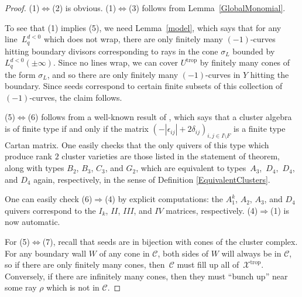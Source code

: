 \documentclass[11pt]{article}
\numberwithin{equation}{section}
\numberwithin{figure}{section}
\numberwithin{table}{section}
\DeclareMathOperator{\trop}{trop}
\let\s=\mathcal
\theoremstyle{definition}
\begin{document}
\begin{proof}(1)$\Leftrightarrow$(2) is obvious. (1)$\Leftrightarrow$(3) follows from Lemma~\ref{GlobalMonomial}.

To see that (1) implies (5), we need Lemma~\ref{model}, which says that for any line~$L_q^{d<0}$ which does not wrap, there are only finitely many $(-1)$-curves hitting boundary divisors corresponding to rays in the cone $\sigma_{L}$ bounded by $L_q^{d<0}(\pm \infty)$. Since no lines wrap, we can cover $U^{\trop}$ by finitely many cones of the form $\sigma_{L}$, and so there are only finitely many $(-1)$-curves in $Y$ hitting the boundary. Since seeds correspond to certain finite subsets of this collection of $(-1)$-curves, the claim follows.

(5)$\Leftrightarrow$(6) follows from a well-known result of \cite{FZ2}, which says that a cluster algebra is of finite type if and only if the matrix $(-|\epsilon_{ij}|+2\delta_{ij})_{i,j\in I\setminus F}$ is a finite type Cartan matrix. One easily checks that the only quivers of this type which produce rank $2$ cluster varieties are those listed in the statement of theorem, along with types $B_2$, $B_3$, $C_3$, and $G_2$, which are equivalent to types~$A_3$,~$D_4$,~$D_4$, and $D_4$ again, respectively, in the sense of Definition \ref{EquivalentClusters}.

 One can easily check (6)$\Rightarrow$(4) by explicit computations: the $A_1^k$, $A_2$, $A_3$, and $D_4$ quivers correspond to the $I_k$, $II$, $III$, and $IV$ matrices, respectively. (4)$\Rightarrow$(1) is now automatic.

For (5)$\Leftrightarrow$(7), recall that seeds are in bijection with cones of the cluster complex. For any boundary wall $W$ of any cone in $\s{C}$, both sides of $W$ will always be in $\s{C}$, so if there are only finitely many cones, then~$\s{C}$ must fill up all of~$\s{X}^{\trop}$. Conversely, if there are infinitely many cones, then they must ``bunch up'' near some ray $\rho$ which is not in $\s{C}$.
\end{proof}
\end{document}
